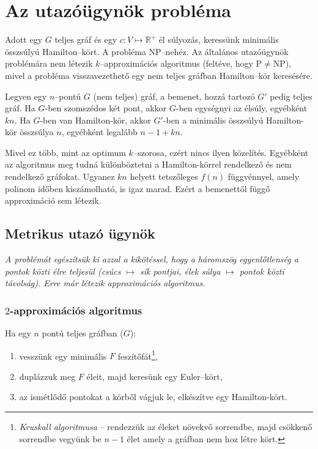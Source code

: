\skiptooddpage 
\section{Az utazóügynök probléma}

Adott egy $G$ teljes gráf és egy $c:V \mapsto \mathbb{R}^+$ él súlyozás,
keressünk minimális összsúlyú Hamilton--kört. A probléma NP--nehéz. Az általános
utazóügynök problémára nem létezik $k$--approximációs algoritmus (feltéve, hogy
P$\ne$NP), mivel a probléma visszavezethető egy nem teljes gráfban Hamilton--kör
keresésére.

Legyen egy $n$--pontú $G$ (nem teljes) gráf, a bemenet, hozzá tartozó $G'$ pedig
teljes gráf. Ha $G$-ben szomszédos két pont, akkor $G$-ben egységnyi az élsúly,
egyébként $kn$. Ha $G$-ben van Hamilton-kör, akkor $G'$-ben a minimális
összsúlyú Hamilton-kör összsúlya $n$, egyébként legalább $n-1+kn$. 

Mivel ez több, mint az optimum $k$--szorosa, ezért nincs ilyen közelítés.
Egyébként az algoritmus meg tudná különböztetni a Hamilton-körrel rendelkező és
nem rendelkező gráfokat. Ugyanez $kn$ helyett tetszőleges $f(n)$ függvénnyel,
amely polinom időben kiszámolható, is igaz marad. Ezért a bemenettől függő
approximáció sem létezik.

\subsection{Metrikus utazó ügynök}

\emph{A problémát egészítsük ki azzal a kikötéssel, hogy a háromszög
egyenlőtlenség a pontok közti élre teljesül (csúcs $\mapsto$ sík pontjai, élek
súlya $\mapsto$ pontok közti távolság). Erre már létezik approximációs
algoritmus.}

\subsubsection{$2$-approximációs algoritmus}

Ha egy $n$ pontú teljes gráfban ($G$):
\begin{enumerate}
  \item vesszünk egy minimális $F$ feszítőfát\footnote{\emph{Kruskall algoritmusa} -- 
rendezzük az éleket növekvő sorrendbe, majd csökkenő sorrendbe vegyünk be $n-1$ élet
amely a gráfban nem hoz létre kört.},
  \item duplázzuk meg $F$ éleit, majd keresünk egy Euler--kört,
  \item az ismétlődő pontokat a körből vágjuk le, elkészítve egy Hamilton-kört.
\end{enumerate}

